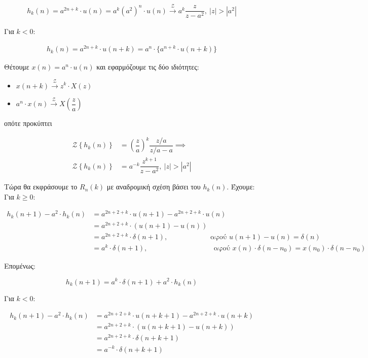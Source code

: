 \documentclass[12pt,a4paper]{article}
\begin{document}
			\begin{align*}
				h_k(n) = a^{2n+k} \cdot u(n) = a^k \left(a^2\right)^n \cdot u(n) \xrightarrow{\mathcal{Z}} a^k \dfrac{z}{z-a^2}, \ |z| > |a^2| 
			\end{align*}
			
			Για $k < 0$:
			
			\begin{align*}
				h_k(n) = a^{2n+k} \cdot u(n+k) = a^n \cdot \{a^{n+k} \cdot u(n+k)\}
			\end{align*}
			
			Θέτουμε $x(n) = a^n \cdot u(n)$ και εφαρμόζουμε τις δύο ιδιότητες:
			
			\begin{itemize}
				\item $x(n+k) \xrightarrow{\mathcal{Z}} z^k \cdot X(z)$
				\item $a^n \cdot x(n) \xrightarrow{\mathcal{Z}} X\left(\dfrac{z}{a}\right)$
			\end{itemize}

			οπότε προκύπτει 
			
			\begin{align*}
				\mathcal{Z}\left\{h_k(n)\right\} &= \left(\dfrac{z}{a}\right)^k \dfrac{z/a}{z/a-a} \implies \\
				\mathcal{Z}\left\{h_k(n)\right\} &= a^{-k}\dfrac{z^{k+1}}{z-a^2}, \ |z| > |a^2|
			\end{align*}

		Τώρα θα εκφράσουμε το $R_n(k)$ με αναδρομική σχέση βάσει του $h_k(n)$. Έχουμε: \\
		
		Για $k \geq 0$:
		
		\begin{align*}
			h_k(n+1) - a^2 \cdot h_k(n) &= a^{2n+2+k} \cdot u(n+1) - a^{2n+2+k} \cdot u(n) \\
			&= a^{2n+2+k} \cdot (u(n+1) - u(n)) \\ 
			&= a^{2n+2+k} \cdot \delta(n+1), \text{~~~~~~~~~~~~~~~~~~αφού } u(n+1) - u(n) = \delta(n)\\
			&= a^k \cdot \delta(n+1), \text{~~~~~~~~~~~~~~~~~~~~~~~~~~~~αφού } x(n) \cdot \delta(n-n_0) = x(n_0) \cdot \delta(n-n_0)
		\end{align*}
		
		Επομένως:
		
		\[
			h_k(n+1) = a^k \cdot \delta(n+1) + a^2 \cdot h_k(n)
		\]
		
		Για $k < 0$:
		
		\begin{align*}
			h_k(n+1) - a^2 \cdot h_k(n) &= a^{2n+2+k} \cdot u(n+k+1) - a^{2n+2+k} \cdot u(n+k) \\
			&= a^{2n+2+k} \cdot (u(n+k+1) - u(n+k)) \\ 
			&= a^{2n+2+k} \cdot \delta(n+k+1)\\
			&= a^{-k} \cdot \delta(n+k+1)
		\end{align*}
		
\end{document}
